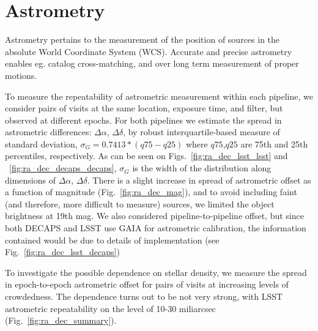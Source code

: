 \documentclass[DM,lsstdraft,toc,usenatbib,authoryear]{lsstdoc}
\begin{document}


\section{Astrometry}
\label{sec:astrometry}
Astrometry pertains to the measurement of the position of sources in the absolute World Coordinate System (WCS). Accurate and precise astrometry enables eg. catalog cross-matching, and over long term measurement of proper motions.

To measure the repeatability of astrometric measurement within each pipeline, we consider pairs of visits at the same location, exposure time, and filter, but observed at different epochs. For both pipelines we estimate the spread in astrometric differences:  $\Delta \alpha$, $\Delta \delta$, by robust interquartile-based measure of standard deviation, $\sigma_{G} =  0.7413 * (q75 - q25)$ where $q75$,$q25$ are 75th and 25th percentiles, respectively.
As can be seen on Figs.~\ref{fig:ra_dec_lsst_lsst} and ~\ref{fig:ra_dec_decaps_decaps}, $\sigma_{G}$ is the width of the distribution along dimensions of $\Delta \alpha$, $\Delta \delta$. There is a slight increase in spread of astrometric offset as a function of magnitude (Fig.~\ref{fig:ra_dec_mag}), and to avoid including faint (and therefore, more difficult to measure) sources, we limited the object brightness at 19th mag.  We also considered pipeline-to-pipeline offset, but since both DECAPS and LSST use GAIA for astrometric calibration, the information contained would be due to details of implementation (see Fig.~\ref{fig:ra_dec_lsst_decaps})

To investigate the possible dependence on stellar density, we measure the spread  in epoch-to-epoch astrometric offset for pairs of visits at increasing levels of crowdedness. The dependence turns out to be not very strong, with LSST astrometric repeatability on the level of 10-30 miliarcsec (Fig.~\ref{fig:ra_dec_summary}).
\end{document}
